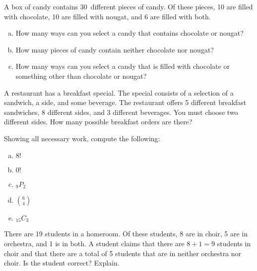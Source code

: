 \documentclass[11pt,letterpaper]{article}
\begin{document}

 A box of candy contains 30~different pieces of candy. Of these pieces, 10 are filled with chocolate, 10 are filled with nougat, and 6 are filled with both. 
	\begin{enumerate}[(a)]
	\item How many ways can you select a candy that contains chocolate or nougat?
	\item How many pieces of candy contain neither chocolate nor nougat?
	\item How many ways can you select a candy that is filled with chocolate or something other than chocolate or nougat?
	\end{enumerate} 



\newpage



 A restaurant has a breakfast special. The special consists of a selection of a sandwich, a side, and some beverage. The restaurant offers 5 different breakfast sandwiches, 8 different sides, and 3 different beverages. You must choose two different sides. How many possible breakfast orders are there? 



\newpage



 Showing all necessary work, compute the following:
	\begin{enumerate}[(a)]
	\item $8!$
	\item $0!$
	\item $_9P_2$
	\item $\binom{6}{4}$
	\item $_{15}C_3$
	\end{enumerate}



\newpage



 There are 19 students in a homeroom. Of these students, 8 are in choir, 5 are in orchestra, and 1 is in both. A student claims that there are $8 + 1= 9$ students in choir and that there are a total of 5 students that are in neither orchestra nor choir. Is the student correct? Explain. 
\end{document}
